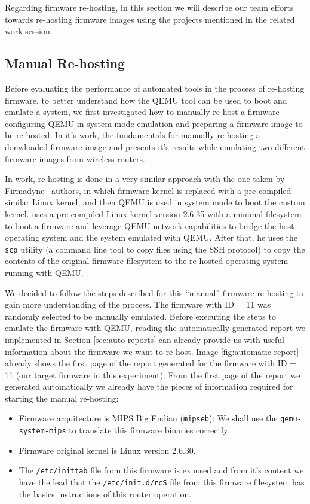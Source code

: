 Regarding firmware re-hosting, in this section we will describe our team efforts towards re-hosting firmware images using the projects mentioned in the related work session.

\subsection{Manual Re-hosting}
\label{sec:manual-rehosting}

Before evaluating the performance of automated tools in the process of re-hosting firmware, to better understand how the QEMU tool can be used to boot and emulate a system, we first investigated how to manually re-host a firmware configuring QEMU in system mode emulation and preparing a firmware image to be re-hosted. In it's work, \cite{victor-sales} the fundamentals for manually re-hosting a donwloaded firmware image and presents it's results while emulating two different firmware images from wireless routers.

In \cite{victor-sales} work, re-hosting is done in a very similar approach with the one taken by Firmadyne~\cite{firmadyne} authors, in which firmware kernel is replaced with a pre-compiled similar Linux kernel, and then QEMU is used in system mode to boot the custom kernel. \cite{victor-sales} uses a pre-compiled Linux kernel version 2.6.35 with a minimal filesystem to boot a firmware and leverage QEMU network capabilities to bridge the host operating system and the system emulated with QEMU. After that, he uses the {\tt scp} utility (a command line tool to copy files using the SSH protocol) to copy the contents of the original firmware filesystem to the re-hosted operating system running with QEMU.

We decided to follow the steps described for this ``manual'' firmware re-hosting to gain more understanding of the process. The firmware with ID = 11 was randomly selected to be manually emulated. Before executing the steps to emulate the firmware with QEMU, reading the automatically generated report we implemented in Section \ref{sec:auto-reports} can already provide us with useful information about the firmware we want to re-host. Image \ref{fig:automatic-report} already shows the first page of the report generated for the firmware with ID = 11 (our target firmware in this experiment). From the first page of the report we generated automatically we already have the pieces of information required for starting the manual re-hosting:

\begin{itemize}
    \item Firmware arquitecture is MIPS Big Endian ({\tt mipseb}): We shall use the {\tt qemu-system-mips} to translate this firmware binaries correctly.
    \item Firmware original kernel is Linux version 2.6.30.
    \item The {\tt /etc/inittab} file from this firmware is exposed and from it's content we have the lead that the {\tt /etc/init.d/rcS} file from this firmware filesystem has the basics instructions of this router operation.
\end{itemize}

